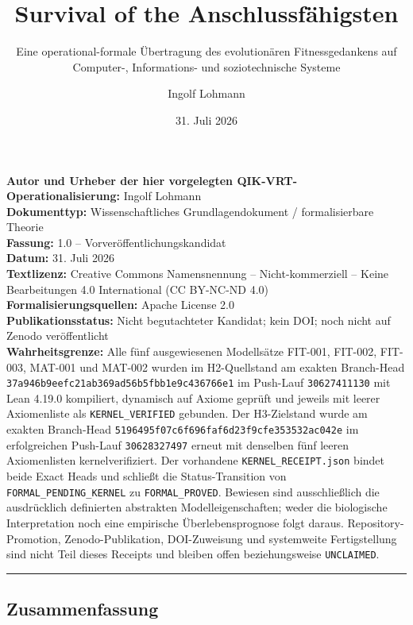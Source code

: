 \documentclass[
  10pt,
  a4paper,
]{article}
\title{Survival of the Anschlussfähigsten}
\subtitle{Eine operational-formale Übertragung des evolutionären
Fitnessgedankens auf Computer-, Informations- und soziotechnische
Systeme}
\author{Ingolf Lohmann}
\date{31. Juli 2026}
\begin{document}
\sloppy
\maketitle

\renewcommand*\contentsname{Inhalt}
{
\hypersetup{linkcolor=}
\setcounter{tocdepth}{3}
\tableofcontents
}
\textbf{Autor und Urheber der hier vorgelegten
QIK-VRT-Operationalisierung:} Ingolf Lohmann\\
\textbf{Dokumenttyp:} Wissenschaftliches Grundlagendokument /
formalisierbare Theorie\\
\textbf{Fassung:} 1.0 -- Vorveröffentlichungskandidat\\
\textbf{Datum:} 31. Juli 2026\\
\textbf{Textlizenz:} Creative Commons Namensnennung -- Nicht-kommerziell
-- Keine Bearbeitungen 4.0 International (CC BY-NC-ND 4.0)\\
\textbf{Formalisierungsquellen:} Apache License 2.0\\
\textbf{Publikationsstatus:} Nicht begutachteter Kandidat; kein DOI;
noch nicht auf Zenodo veröffentlicht\\
\textbf{Wahrheitsgrenze:} Alle fünf ausgewiesenen Modellsätze FIT-001,
FIT-002, FIT-003, MAT-001 und MAT-002 wurden im H2-Quellstand am exakten
Branch-Head \texttt{37a946b9eefc21ab369ad56b5fbb1e9c436766e1} im
Push-Lauf \texttt{30627411130} mit Lean 4.19.0 kompiliert, dynamisch auf
Axiome geprüft und jeweils mit leerer Axiomenliste als
\texttt{KERNEL\_VERIFIED} gebunden. Der H3-Zielstand wurde am exakten
Branch-Head \texttt{5196495f07c6f696faf6d23f9cfe353532ac042e} im
erfolgreichen Push-Lauf \texttt{30628327497} erneut mit denselben fünf
leeren Axiomenlisten kernelverifiziert. Der vorhandene
\texttt{KERNEL\_RECEIPT.json} bindet beide Exact Heads und schließt die
Status-Transition von \texttt{FORMAL\_PENDING\_KERNEL} zu
\texttt{FORMAL\_PROVED}. Bewiesen sind ausschließlich die ausdrücklich
definierten abstrakten Modelleigenschaften; weder die biologische
Interpretation noch eine empirische Überlebensprognose folgt daraus.
Repository-Promotion, Zenodo-Publikation, DOI-Zuweisung und systemweite
Fertigstellung sind nicht Teil dieses Receipts und bleiben offen
beziehungsweise \texttt{UNCLAIMED}.

\begin{center}\rule{0.5\linewidth}{0.5pt}\end{center}

\hypertarget{zusammenfassung}{%
\subsection{Zusammenfassung}\label{zusammenfassung}}
\end{document}

